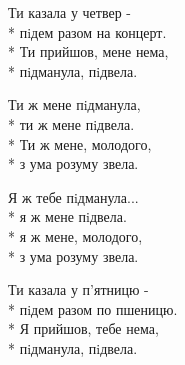 \medskip

\begin{minipage}{\linewidth}
Ти казала у четвер -\\*
пiдем разом на концерт.\\*
Ти прийшов, мене нема,\\*
пiдманула, пiдвела.\\
\end{minipage}\par\medskip\nobreak

\medskip

\begin{minipage}{\linewidth}
\hspace*{1.5em}Ти ж мене пiдманула,\\*
\hspace*{1.5em}ти ж мене пiдвела.\\*
\hspace*{1.5em}Ти ж мене, молодого,\\*
\hspace*{1.5em}з ума розуму звела.\\
\end{minipage}\par\medskip\nobreak

\medskip

\begin{minipage}{\linewidth}
\hspace*{1.5em}Я ж тебе пiдманула...\\*
\hspace*{1.5em}я ж мене пiдвела.\\*
\hspace*{1.5em}я ж мене, молодого,\\*
\hspace*{1.5em}з ума розуму звела.\\
\end{minipage}\par\medskip\nobreak

\medskip

\begin{minipage}{\linewidth}
Ти казала у п’ятницю -\\*
пiдем разом по пшеницю.\\*
Я прийшов, тебе нема,\\*
пiдманула, пiдвела.\\
\end{minipage}\par\medskip\nobreak

\medskip


